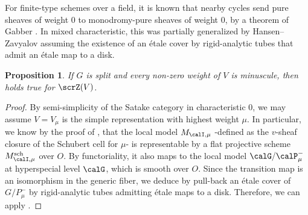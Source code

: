 \documentclass[10pt, reqno]{amsart}
\theoremstyle{plain}
\newtheorem{proposition}[theorem]{Proposition}
\theoremstyle{definition}
\newcommand{\Joao}[1]{\framebox{\begin{varwidth}{0.9\textwidth} João: #1 \end{varwidth}}\newline}
\numberwithin{equation}{section}
\begin{document}
	For finite-type schemes over a field, it is known that nearby cycles send pure sheaves of weight $0$ to monodromy-pure sheaves of weight $0$, by a theorem of Gabber \cite[Theorem 5.1.2]{BB93}. In mixed characteristic, this was partially generalized by Hansen--Zavyalov \cite{HZ23} assuming the existence of an étale cover by rigid-analytic tubes that admit an étale map to a disk.
	
	
	\begin{proposition}\label{prop_wtmon_minuscule}
		If $G$ is split and every non-zero weight of $V$ is minuscule, then  holds true for $\scrZ(V)$. 
	\end{proposition}
	
	\begin{proof}
		By semi-simplicity of the Satake category in characteristic $0$, we may assume $V=V_\mu$ is the simple representation with highest weight $\mu$. 
		In particular, we know by the proof of \cite[Theorem 7.21, 7.23]{AGLR22}, that the local model $M_{\calI,\mu}$ -defined as the $v$-sheaf closure of the Schubert cell for $\mu$- is representable by a flat projective scheme $M_{\calI,\mu}^{\mathrm{sch}}$ over $O$. By functoriality, it also maps to the local model $\calG/\calP_\mu^-$ at hyperspecial level $\calG$, which is smooth over $O$. Since the transition map is an isomorphism in the generic fiber, we deduce by pull-back an étale cover of $G/P_\mu^-$ by rigid-analytic tubes admitting étale maps to a disk. Therefore, we can apply \cite[Theorem 4.4.4]{HZ23}.
	\end{proof}
	
\end{document}
